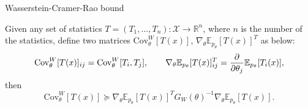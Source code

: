 \documentclass{beamer}
\begin{document}
\begin{frame}{Wasserstein-Cramer-Rao bound}
\begin{theorem}\label{WCR}
Given any set of statistics $T = \left( T_1,...,T_n\right) \colon \mathcal{X}\rightarrow \mathbb{R}^n$, where $n$ is the number of the statistics, define two matrices $\mathrm{Cov}^W_\theta[T(x)]$, $ \nabla_\theta \mathbb{E}_{p_\theta} [T(x)]^{T}$ as below:
\begin{equation*}
    \mathrm{Cov}^W_\theta[T(x)]_{ij} = \mathrm{Cov}^W_\theta[T_i,T_j], \qquad \nabla_\theta \mathbb{E}_{p_\theta} [T(x)]^{T}_{ij} = \frac{\partial}{\partial \theta_j} \mathbb{E}_{p_\theta} [T_i(x)],
\end{equation*}
then
\begin{equation*}
\mathrm{Cov}^W_\theta[T(x)] \succeq \nabla_\theta \mathbb{E}_{p_\theta} [T(x)]^{T}G_W(\theta)^{-1}\nabla_\theta \mathbb{E}_{p_\theta} [T(x)]. 
\end{equation*}
\end{theorem}
\end{frame}
\end{document}
